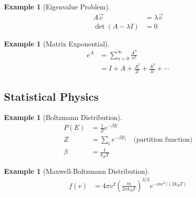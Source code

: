 \documentclass{article}
\newtheorem{example}[theorem]{Example}
\begin{document}
\begin{example}[Eigenvalue Problem]
\begin{align*}
    A\vec{v} &= \lambda\vec{v} \\
    \det(A - \lambda I) &= 0
\end{align*}
\end{example}

\begin{example}[Matrix Exponential]
\begin{align*}
    e^A &= \sum_{n=0}^{\infty} \frac{A^n}{n!} \\
    &= I + A + \frac{A^2}{2!} + \frac{A^3}{3!} + \cdots
\end{align*}
\end{example}

\subsection{Statistical Physics}

\begin{example}[Boltzmann Distribution]
\begin{align*}
    P(E) &= \frac{1}{Z}e^{-\beta E} \\
    Z &= \sum_i e^{-\beta E_i} \quad \text{(partition function)} \\
    \beta &= \frac{1}{k_B T}
\end{align*}
\end{example}

\begin{example}[Maxwell-Boltzmann Distribution]
\begin{align*}
    f(v) &= 4\pi v^2\left(\frac{m}{2\pi k_B T}\right)^{3/2}e^{-mv^2/(2k_B T)}
\end{align*}
\end{example}
\end{document}
